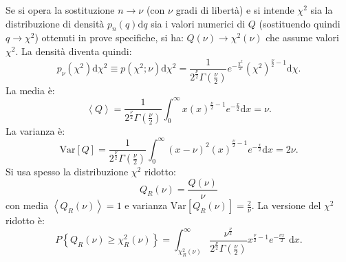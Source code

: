 Se si opera la sostituzione $n\rightarrow \nu $ (con $\nu$ gradi di libertà) e si intende $\chi^2$ sia la distribuzione di densità ${ p }_{ n }\left( q \right) \textrm{d}q$ sia i valori numerici di $Q$ (sostituendo quindi $q\rightarrow { \chi  }^{ 2 }$) ottenuti in prove specifiche, si ha: $Q\left( \nu  \right) \rightarrow { \chi  }^{ 2 }\left( \nu  \right) $ che assume valori $\chi^2$. La densità diventa quindi:
\begin{equation}
\label{eq:chi-quadro}
{ p }_{ \nu  }\left( { \chi  }^{ 2 } \right) \textrm{d}{ \chi  }^{ 2 }\equiv p\left( { \chi  }^{ 2 };\nu  \right) \textrm{d}{ \chi  }^{ 2 }=\frac { 1 }{ { 2 }^{ \frac { \nu  }{ 2 }  }\Gamma \left( \frac { \nu  }{ 2 }  \right)  } { e }^{ -\frac { { \chi  }^{ 2 } }{ 2 }  }{ \left( { \chi  }^{ 2 } \right)  }^{ \frac { \nu  }{ 2 } -1 } \textrm{d}{ \chi  }.
\end{equation}
La media è:
\begin{equation}
\left< Q \right> =\frac { 1 }{ { 2 }^{ \frac { \nu  }{ 2 }  }\Gamma \left( \frac { \nu  }{ 2 }  \right)  } \int _{ 0 }^{ \infty  }{ { x\left( x \right)  }^{ \frac { \nu  }{ 2 } -1 }{ e }^{ -\frac { x }{ 2 }  } \textrm{d}x } =\nu .
\end{equation}
La varianza è:
\begin{equation}
\textrm{Var}\left[ Q \right] =\frac { 1 }{ { 2 }^{ \frac { \nu  }{ 2 }  }\Gamma \left( \frac { \nu  }{ 2 }  \right)  } \int _{ 0 }^{ \infty  }{ { { \left( x-\nu  \right)  }^{ 2 }\left( x \right)  }^{ \frac { \nu  }{ 2 } -1 }{ e }^{ -\frac { x }{ 2 }  } \textrm{d}x } =2\nu .
\end{equation}
Si usa spesso la distribuzione $\chi^2$ ridotto:
\begin{equation}
\label{eq:chi-ridotto}
{ Q }_{ R }\left( \nu  \right) =\frac { Q\left( \nu  \right)  }{ \nu  } 
\end{equation}
con media $\left< { Q }_{ R }\left( \nu  \right)  \right> =1$ e varianza $\textrm{Var}\left[ { Q }_{ R }\left( \nu  \right)  \right] =\frac { 2 }{ \nu  } $.
La versione del $\chi^2$ ridotto è:
\begin{equation}
\label{eq:chi-ridotto-int}
P\left\{ { Q }_{ R }\left( \nu  \right) \ge { \chi  }_{ R }^{ 2 }\left( \nu  \right)  \right\} =\int _{ { \chi  }_{ R }^{ 2 }\left( \nu  \right)  }^{ \infty  }{ \frac { { \nu  }^{ \frac { \nu  }{ 2 }  } }{ { 2 }^{ \frac { \nu  }{ 2 }  }\Gamma \left( \frac { \nu  }{ 2 }  \right)  } { x }^{ \frac { \nu  }{ 2 } -1 }{ e }^{ -\frac { \nu x }{ 2 }  }\textrm{ d}x } .
\end{equation}

